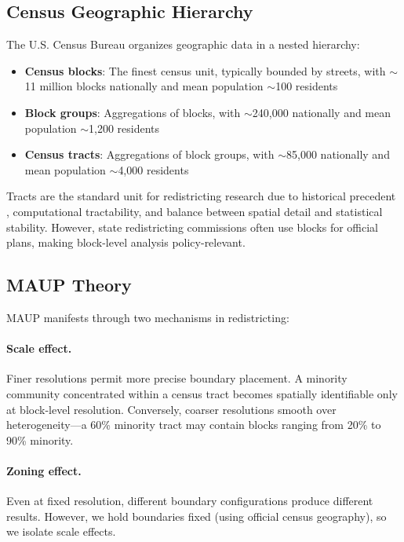 
\subsection{Census Geographic Hierarchy}

The U.S. Census Bureau organizes geographic data in a nested hierarchy:

\begin{itemize}
    \item \textbf{Census blocks}: The finest census unit, typically bounded by streets, with $\sim$11 million blocks nationally and mean population $\sim$100 residents
    \item \textbf{Block groups}: Aggregations of blocks, with $\sim$240,000 nationally and mean population $\sim$1,200 residents
    \item \textbf{Census tracts}: Aggregations of block groups, with $\sim$85,000 nationally and mean population $\sim$4,000 residents
\end{itemize}

Tracts are the standard unit for redistricting research due to historical precedent \citep{census-geography}, computational tractability, and balance between spatial detail and statistical stability. However, state redistricting commissions often use blocks for official plans, making block-level analysis policy-relevant.

\subsection{MAUP Theory}

MAUP manifests through two mechanisms in redistricting:

\paragraph{Scale effect.} Finer resolutions permit more precise boundary placement. A minority community concentrated within a census tract becomes spatially identifiable only at block-level resolution. Conversely, coarser resolutions smooth over heterogeneity---a 60\% minority tract may contain blocks ranging from 20\% to 90\% minority.

\paragraph{Zoning effect.} Even at fixed resolution, different boundary configurations produce different results. However, we hold boundaries fixed (using official census geography), so we isolate scale effects.


